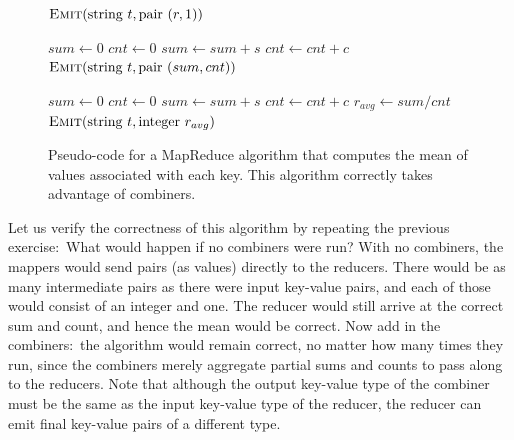 \begin{figure}[t]
\algrenewcommand{}
\algrenewcommand{}
  \begin{algorithmic}[1]
    \State $\textsc{Emit}(\textrm{string }t, \textrm{pair }(r, 1))$
    \EndProcedure
    \EndFunction
  \end{algorithmic}

  \begin{algorithmic}[1]
    \State $sum \gets 0$
    \State $cnt \gets 0$
    \State $sum \gets sum + s$
    \State $cnt \gets cnt + c$
    \EndFor
    \State $\textsc{Emit}(\textrm{string }t, \textrm{pair }(sum, cnt))$
    \EndProcedure
    \EndFunction
  \end{algorithmic}

  \begin{algorithmic}[1]
    \State $sum \gets 0$
    \State $cnt \gets 0$
    \State $sum \gets sum + s$
    \State $cnt \gets cnt + c$
    \EndFor
    \State $r_{avg} \gets sum/cnt$
    \State $\textsc{Emit}(\textrm{string }t, \textrm{integer } r_{avg})$
    \EndProcedure
    \EndFunction
  \end{algorithmic}
  \caption{Pseudo-code for a MapReduce algorithm that computes the
    mean of values associated with each key.  This algorithm correctly
    takes advantage of combiners.}
\label{figure:chapter3:average-efficient}
\end{figure}

Let us verify the correctness of this algorithm by repeating the
previous exercise:\ What would happen if no combiners were run?  With
no combiners, the mappers would send pairs (as values) directly to the
reducers.  There would be as many intermediate pairs as there were
input key-value pairs, and each of those would consist of an integer
and one.  The reducer would still arrive at the correct sum and count,
and hence the mean would be correct.  Now add in the combiners:\ the
algorithm would remain correct, no matter how many times they run,
since the combiners merely aggregate partial sums and counts to pass
along to the reducers.  Note that although the output key-value type
of the combiner must be the same as the input key-value type of the
reducer, the reducer can emit final key-value pairs of a different
type.


